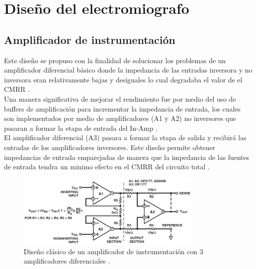 \chapter{Diseño del electromiografo} 
\section{Amplificador de instrumentación}
Este diseño se propuso con la finalidad de solucionar los problemas de un amplificador diferencial básico donde la impedancia de las entradas inversora y no inversora eran relativamente bajas y desiguales lo cual degradaba el valor de el CMRR \cite{design guide}.\\

Una manera significativa de mejorar el rendimiento fue por medio del uso de buffers de amplificación para incrementar la impedancia de entrada, los cuales son implementados por medio de amplificadores (A1 y A2) no inversores que pasaran a formar la etapa de entrada del In-Amp \cite{design guide}.\\

El amplificador diferencial (A3) pasara a formar la etapa de salida y recibirá las entradas de los amplificadores inversores. Este diseño permite obtener impedancias de entrada emparejadas de manera que la impedancia de las fuentes de entrada tendra un minimo efecto en el CMRR del circuito total \cite{design guide}.



\begin{figure}[H]
  \centering
  \includegraphics[width=0.8\textwidth]{Capitulo_2/Amplificador_instrumentacion.png}
  \caption{Diseño clásico de un amplificador de instrumentación con 3 amplificadores diferenciales \cite{design guide}.}
  \label{amp instrumentacion clasico} 
\end{figure}


